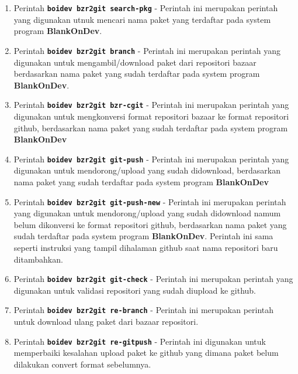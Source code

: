 \begin{enumerate}
	\item Perintah \texttt{\textbf{boidev bzr2git search-pkg}} - Perintah ini merupakan perintah yang digunakan utnuk mencari nama paket yang terdaftar pada system program \textbf{BlankOnDev}.

	\item Perintah \texttt{\textbf{boidev bzr2git branch}} - Perintah ini merupakan perintah yang digunakan untuk mengambil/download paket dari repositori bazaar berdasarkan nama paket yang sudah terdaftar pada system program \textbf{BlankOnDev}.

	\item Perintah \texttt{\textbf{boidev bzr2git bzr-cgit}} - Perintah ini merupakan perintah yang digunakan untuk mengkonversi format repositori bazaar ke format repositori github, berdasarkan nama paket yang sudah terdaftar pada system program \textbf{BlankOnDev}

	\item Perintah \texttt{\textbf{boidev bzr2git git-push}} - Perintah ini merupakan perintah yang digunakan untuk mendorong/upload yang sudah didownload, berdasarkan nama paket yang sudah terdaftar pada system program \textbf{BlankOnDev}

	\item Perintah \texttt{\textbf{boidev bzr2git git-push-new}} - Perintah ini merupakan perintah yang digunakan untuk mendorong/upload yang sudah didownload namum belum dikonversi ke format repositori github, berdasarkan nama paket yang sudah terdaftar pada system program \textbf{BlankOnDev}. Perintah ini sama seperti instruksi yang tampil dihalaman github saat  nama repositori baru ditambahkan.

	\item Perintah \texttt{\textbf{boidev bzr2git git-check}} - Perintah ini merupakan perintah yang digunakan untuk validasi repositori yang sudah diupload ke github.

	\item Perintah \texttt{\textbf{boidev bzr2git re-branch}} - Perintah ini merupakan perintah untuk download ulang paket dari bazaar repositori.

	\item Perintah \texttt{\textbf{boidev bzr2git re-gitpush}} - Perintah ini digunakan untuk memperbaiki kesalahan upload paket ke github yang dimana paket belum dilakukan convert format sebelumnya.
\end{enumerate}

